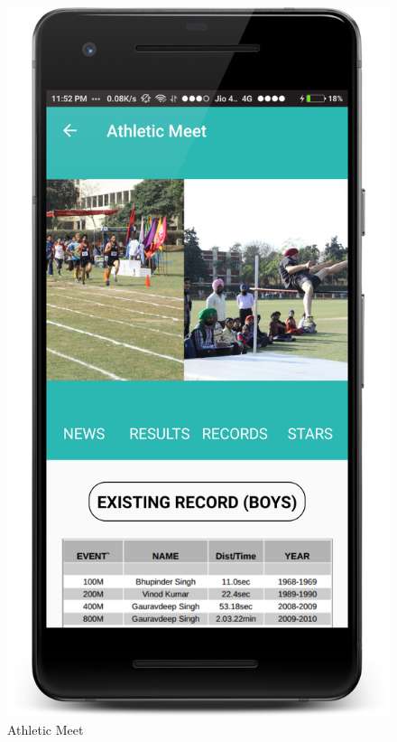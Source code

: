 \begin{figure}[ht]
\centering
\includegraphics[scale=0.20]{images/S5.png}
\caption{Athletic Meet}
\end{figure}

\newpage

